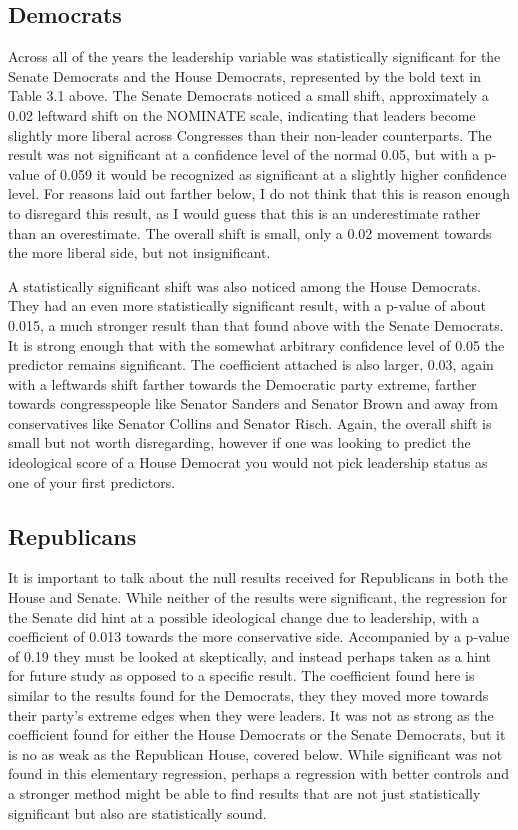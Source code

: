 \documentclass[12pt,twoside]{reedthesis}
\begin{document}
  \subsection{Democrats}\label{democrats}
  
  Across all of the years the leadership variable was statistically
  significant for the Senate Democrats and the House Democrats,
  represented by the bold text in Table 3.1 above. The Senate Democrats
  noticed a small shift, approximately a 0.02 leftward shift on the
  NOMINATE scale, indicating that leaders become slightly more liberal
  across Congresses than their non-leader counterparts. The result was not
  significant at a confidence level of the normal 0.05, but with a p-value
  of 0.059 it would be recognized as significant at a slightly higher
  confidence level. For reasons laid out farther below, I do not think
  that this is reason enough to disregard this result, as I would guess
  that this is an underestimate rather than an overestimate. The overall
  shift is small, only a 0.02 movement towards the more liberal side, but
  not insignificant.
  
  A statistically significant shift was also noticed among the House
  Democrats. They had an even more statistically significant result, with
  a p-value of about 0.015, a much stronger result than that found above
  with the Senate Democrats. It is strong enough that with the somewhat
  arbitrary confidence level of 0.05 the predictor remains significant.
  The coefficient attached is also larger, 0.03, again with a leftwards
  shift farther towards the Democratic party extreme, farther towards
  congresspeople like Senator Sanders and Senator Brown and away from
  conservatives like Senator Collins and Senator Risch. Again, the overall
  shift is small but not worth disregarding, however if one was looking to
  predict the ideological score of a House Democrat you would not pick
  leadership status as one of your first predictors.
  
  \subsection{Republicans}\label{republicans}
  
  It is important to talk about the null results received for Republicans
  in both the House and Senate. While neither of the results were
  significant, the regression for the Senate did hint at a possible
  ideological change due to leadership, with a coefficient of 0.013
  towards the more conservative side. Accompanied by a p-value of 0.19
  they must be looked at skeptically, and instead perhaps taken as a hint
  for future study as opposed to a specific result. The coefficient found
  here is similar to the results found for the Democrats, they they moved
  more towards their party's extreme edges when they were leaders. It was
  not as strong as the coefficient found for either the House Democrats or
  the Senate Democrats, but it is no as weak as the Republican House,
  covered below. While significant was not found in this elementary
  regression, perhaps a regression with better controls and a stronger
  method might be able to find results that are not just statistically
  significant but also are statistically sound.
  
\end{document}
